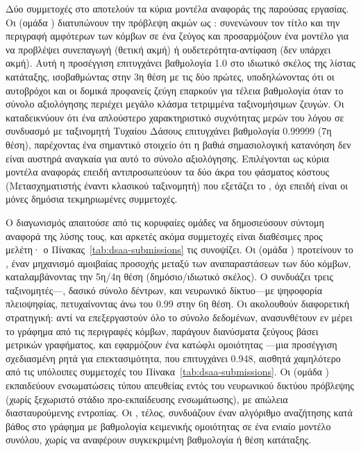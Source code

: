 Δύο συμμετοχές στο  αποτελούν τα κύρια μοντέλα αναφοράς της παρούσας
εργασίας.
Οι \textcite{phan2023link} (ομάδα ) διατυπώνουν την πρόβλεψη
ακμών ως : συνενώνουν τον τίτλο και την περιγραφή
αμφότερων των κόμβων σε ένα ζεύγος  και προσαρμόζουν ένα μοντέλο
 για να προβλέψει συνεπαγωγή (θετική ακμή) ή ουδετερότητα-αντίφαση
(δεν υπάρχει ακμή).
Αυτή η προσέγγιση επιτυγχάνει βαθμολογία  1.0 στο ιδιωτικό
σκέλος της λίστας κατάταξης, ισοβαθμώντας στην 3η θέση με τις δύο πρώτες, υποδηλώνοντας
ότι οι αυτοβρόχοι και οι δομικά προφανείς ζεύγη επαρκούν για τέλεια βαθμολογία όταν το
σύνολο αξιολόγησης περιέχει μεγάλο κλάσμα τετριμμένα ταξινομήσιμων ζευγών.
Οι \textcite{tran2023text} καταδεικνύουν
ότι ένα απλούστερο χαρακτηριστικό συχνότητας μερών του λόγου σε συνδυασμό με
ταξινομητή Τυχαίου Δάσους επιτυγχάνει βαθμολογία  0.99999 (7η θέση),
παρέχοντας ένα σημαντικό στοιχείο ότι η βαθιά σημασιολογική κατανόηση δεν είναι αυστηρά
αναγκαία για αυτό το σύνολο αξιολόγησης.
Επιλέγονται ως κύρια μοντέλα αναφοράς επειδή
αντιπροσωπεύουν τα δύο άκρα του φάσματος κόστους (Μετασχηματιστής έναντι κλασικού
ταξινομητή) που εξετάζει το , όχι επειδή είναι οι μόνες δημόσια
τεκμηριωμένες συμμετοχές.

Ο διαγωνισμός απαιτούσε από τις κορυφαίες ομάδες να δημοσιεύσουν σύντομη αναφορά της
λύσης τους, και αρκετές ακόμα συμμετοχές είναι διαθέσιμες προς μελέτη· ο
Πίνακας~\ref{tab:dsaa-submissions} τις συνοψίζει.
Οι \textcite{nguyen2023mat} (ομάδα
) προτείνουν το , έναν
μηχανισμό αμοιβαίας προσοχής μεταξύ των αναπαραστάσεων των δύο κόμβων, καταλαμβάνοντας
την 5η/4η θέση (δημόσιο/ιδιωτικό σκέλος).
Ο \textcite{yang2023achieving} συνδυάζει
τρεις ταξινομητές---, δασικό σύνολο δέντρων, και νευρωνικό
δίκτυο---με ψηφοφορία πλειοψηφίας, πετυχαίνοντας  άνω του 0.99 στην 6η
θέση.
Οι \textcite{giannoulidis2023enhanced} ακολουθούν διαφορετική στρατηγική:
αντί να επεξεργαστούν όλο το σύνολο δεδομένων, ανασυνθέτουν εν μέρει το γράφημα από τις
περιγραφές κόμβων, παράγουν διανύσματα ζεύγους βάσει μετρικών γραφήματος, και εφαρμόζουν
ένα κατώφλι ομοιότητας ---μια προσέγγιση σχεδιασμένη ρητά για επεκτασιμότητα,
που επιτυγχάνει  0.948, αισθητά χαμηλότερο από τις υπόλοιπες συμμετοχές
του Πίνακα~\ref{tab:dsaa-submissions}.
Οι \textcite{mata2023link} (ομάδα )
εκπαιδεύουν ενσωματώσεις τύπου  απευθείας εντός του νευρωνικού δικτύου
πρόβλεψης (χωρίς ξεχωριστό στάδιο προ-εκπαίδευσης ενσωμάτωσης), με απώλεια διασταυρούμενης
εντροπίας.
Οι \textcite{kansal2023predict}, τέλος, συνδυάζουν έναν αλγόριθμο αναζήτησης
κατά βάθος στο γράφημα με βαθμολογία κειμενικής ομοιότητας σε ένα ενιαίο μοντέλο
συνόλου, χωρίς να αναφέρουν συγκεκριμένη βαθμολογία ή θέση κατάταξης.

